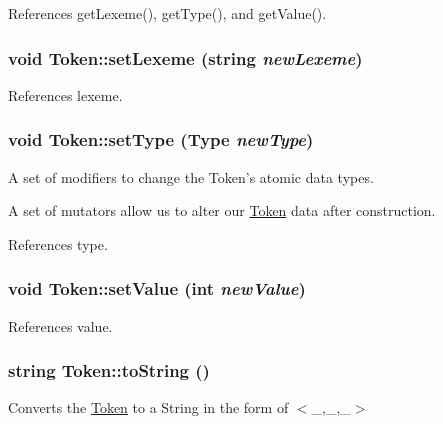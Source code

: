References getLexeme(), getType(), and getValue().

\hypertarget{classToken_aed8a3626e2ef382587f66befa0f5761f}{
\subsubsection[{setLexeme}]{\setlength{\rightskip}{0pt plus 5cm}void Token::setLexeme (string {\em newLexeme})}}
\label{classToken_aed8a3626e2ef382587f66befa0f5761f}


References lexeme.

\hypertarget{classToken_a693d12716fcbf365e115dde0314ee306}{
\subsubsection[{setType}]{\setlength{\rightskip}{0pt plus 5cm}void Token::setType ({\bf Type} {\em newType})}}
\label{classToken_a693d12716fcbf365e115dde0314ee306}


A set of modifiers to change the Token's atomic data types. 

A set of mutators allow us to alter our \hyperlink{classToken}{Token} data after construction.

References type.

\hypertarget{classToken_ab015619f67bf97abb8d00a9037cafd49}{
\subsubsection[{setValue}]{\setlength{\rightskip}{0pt plus 5cm}void Token::setValue (int {\em newValue})}}
\label{classToken_ab015619f67bf97abb8d00a9037cafd49}


References value.

\hypertarget{classToken_a4e0ca338277bccb0f820f5149e82af79}{
\subsubsection[{toString}]{\setlength{\rightskip}{0pt plus 5cm}string Token::toString ()}}
\label{classToken_a4e0ca338277bccb0f820f5149e82af79}


Converts the \hyperlink{classToken}{Token} to a String in the form of $<$\_\-,\_\-,\_\-$>$ 

